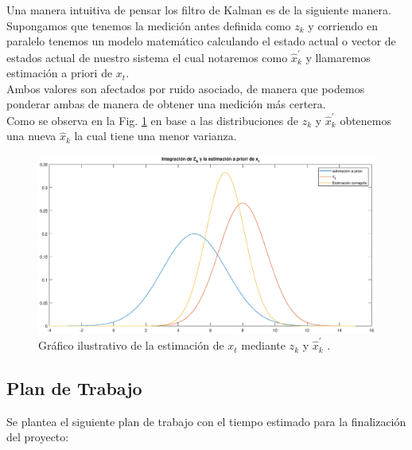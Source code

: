 \documentclass[10pt,a4paper]{article}
\begin{document}
Una manera intuitiva de pensar los filtro de Kalman es de la siguiente manera.
Supongamos que tenemos la medición antes definida como $z_k$ y corriendo en paralelo tenemos un modelo matemático calculando el estado actual o vector de estados actual de nuestro sistema el cual notaremos como $\hat{x}^\prime_k$ y llamaremos estimación a priori de $x_{t}$.\\

Ambos valores son afectados por ruido asociado, de manera que podemos ponderar ambas de manera de obtener una medición más certera.\\

Como se observa en la Fig. \ref{KF_Integration_concept} en base a las distribuciones de $z_k$ y $\hat{x}^\prime_k$ obtenemos una nueva $\hat{x}_k$ la cual tiene una menor varianza.\\

\begin{figure}[h!]
	\begin{center}
		\includegraphics[width=1\textwidth]{KF_Integration_concept.eps}
		\caption{Gráfico ilustrativo de la estimación de $x_{t}$ mediante $z_k$ y $\hat{x}^\prime_k$ .}
		\label{KF_Integration_concept}
	\end{center}
\end{figure}


\clearpage
\subsection{Plan de Trabajo}

Se plantea el siguiente plan de trabajo con el tiempo estimado para la finalización del proyecto:
\end{document}
